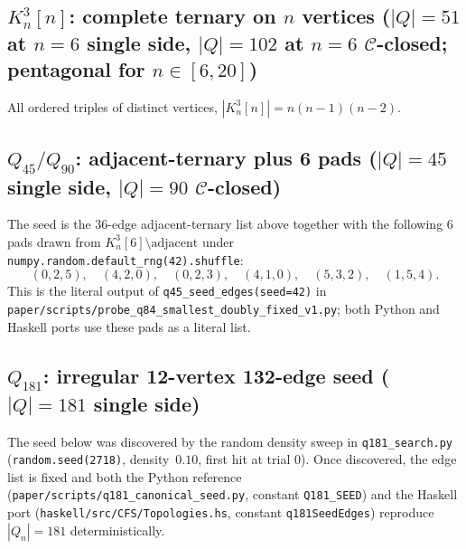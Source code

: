 \documentclass[12pt,a4paper]{article}
\theoremstyle{definition}
\theoremstyle{remark}
\newcommand{\Kn}{K_n^3}
\newcommand{\Qn}{Q_n}
\newcommand{\Ccls}{\mathcal{C}}             %
\begin{document}
\subsection*{$\Kn[n]$: complete ternary on $n$ vertices
($|Q| = 51$ at $n = 6$ single side, $|Q| = 102$ at $n = 6$
$\Ccls$-closed; pentagonal for $n \in [6, 20]$)}

All ordered triples of distinct vertices, $|\Kn[n]| = n(n{-}1)(n{-}2)$.

\subsection*{$Q_{45} / Q_{90}$: adjacent-ternary plus 6 pads
($|Q| = 45$ single side, $|Q| = 90$ $\Ccls$-closed)}

The seed is the $36$-edge adjacent-ternary list above together with the
following $6$ pads drawn from $\Kn[6] \setminus \mathrm{adjacent}$
under \texttt{numpy.random.default\_rng(42).shuffle}:
\[
(0,2,5),\quad (4,2,0),\quad (0,2,3),\quad (4,1,0),\quad (5,3,2),\quad (1,5,4).
\]
This is the literal output of \texttt{q45\_seed\_edges(seed=42)} in
\texttt{paper/scripts/probe\_q84\_smallest\_doubly\_fixed\_v1.py};
both Python and Haskell ports use these pads as a literal list.

\subsection*{$Q_{181}$: irregular 12-vertex 132-edge seed
($|Q| = 181$ single side)}

The seed below was discovered by the random density sweep in
\texttt{q181\_search.py} (\texttt{random.seed(2718)}, density~$0.10$,
first hit at trial 0). Once discovered, the edge list is fixed and
both the Python reference
(\texttt{paper/scripts/q181\_canonical\_seed.py}, constant
\texttt{Q181\_SEED}) and the Haskell port
(\texttt{haskell/src/CFS/Topologies.hs}, constant
\texttt{q181SeedEdges}) reproduce $|\Qn| = 181$ deterministically.
\end{document}

